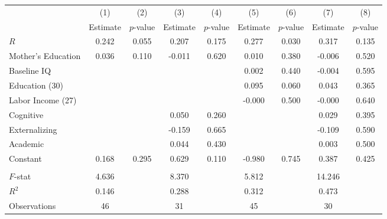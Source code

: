 \begin{tabular}{lcccccccc} \toprule
 & (1) & (2) & (3) & (4) & (5) & (6) & (7) & (8) \\ 
 & Estimate  & $p$-value  & Estimate  & $p$-value  & Estimate  & $p$-value  & Estimate  & $p$-value  \\  \midrule
$R$ &     0.242 &     0.055 &     0.207 &     0.175 &     0.277 &     0.030 &     0.317 &     0.135 \\  
Mother's Education &     0.036 &     0.110 &    -0.011 &     0.620 &     0.010 &     0.380 &    -0.006 &     0.520 \\  
Baseline IQ &         &         &         &         &     0.002 &     0.440 &    -0.004 &     0.595 \\  
Education (30) &         &         &         &         &     0.095 &     0.060 &     0.043 &     0.365 \\  
Labor Income (27) &         &         &         &         &    -0.000 &     0.500 &    -0.000 &     0.640 \\  
Cognitive &         &         &     0.050 &     0.260 &         &         &     0.029 &     0.395 \\  
Externalizing &         &         &    -0.159 &     0.665 &         &         &    -0.109 &     0.590 \\  
Academic &         &         &     0.044 &     0.430 &         &         &     0.003 &     0.500 \\  
Constant &     0.168 &     0.295 &     0.629 &     0.110 &    -0.980 &     0.745 &     0.387 &     0.425 \\ \\  \midrule
$F$-stat &     4.636 &         &     8.370 &         &     5.812 &         &    14.246 &         \\  
$R^2$ &     0.146 &         &     0.288 &         &     0.312 &         &     0.473 &         \\  
Observations &    46 &         &    31 &         &    45 &         &    30 &         \\  
\bottomrule
\end{tabular}

